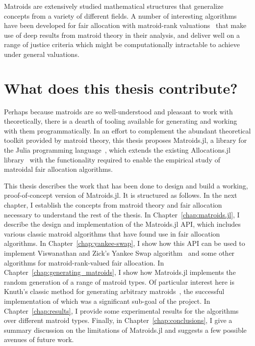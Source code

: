 Matroids are extensively studied mathematical structures that generalize concepts from a variety of different fields. A number of interesting algorithms have been developed for fair allocation with matroid-rank valuations~\cite{barman2020fair,barman2021existence,Benabbou_2020,benabbou-2021,viswanathan2023yankee} that make use of deep results from matroid theory in their analysis, and deliver well on a range of justice criteria which might be computationally intractable to achieve under general valuations. 

\section*{What does this thesis contribute?}
Perhaps because matroids are so well-understood and pleasant to work with theoretically, there is a dearth of tooling available for generating and working with them programmatically. In an effort to complement the abundant theoretical toolkit provided by matroid theory, this thesis proposes Matroids.jl, a library for the Julia programming language~\cite{bezanson2017julia}, which extends the existing Allocations.jl library~\cite{Hetland_Allocations_jl_2022} with the functionality required to enable the empirical study of matroidal fair allocation algorithms. 

This thesis describes the work that has been done to design and build a working, proof-of-concept version of Matroids.jl. It is structured as follows. In the next chapter, I establish the concepts from matroid theory and fair allocation necessary to understand the rest of the thesis. In Chapter~\ref{chap:matroids.jl}, I describe the design and implementation of the Matroids.jl API, which includes various classic matroid algorithms that have found use in fair allocation algorithms. In Chapter~\ref{chap:yankee-swap}, I show how this API can be used to implement Viswanathan and Zick's Yankee Swap algorithm~\cite{viswanathan2023yankee} and some other algorithms for matroid-rank-valued fair allocation. In Chapter~\ref{chap:generating_matroids}, I show how Matroids.jl implements the random generation of a range of matroid types. Of particular interest here is Knuth's classic method for generating arbitrary matroids~\cite{knuth-1975}, the successful implementation of which was a significant sub-goal of the project. In Chapter~\ref{chap:results}, I provide some experimental results for the algorithms over different matroid types. Finally, in Chapter~\ref{chap:conclusions}, I give a summary discussion on the limitations of Matroids.jl and suggests a few possible avenues of future work.
